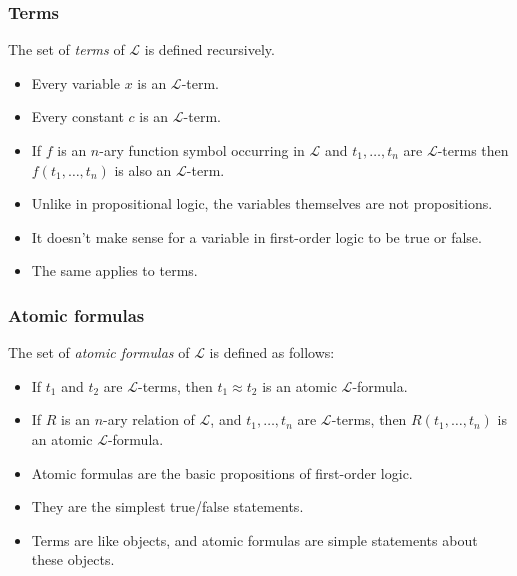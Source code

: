 \documentclass[handout]{beamer}
\newcommand{\sL}{\mathscr{L}}
\begin{document}
\begin{frame}
\frametitle{Terms}

\begin{definition}[Term]
The set of \emph{terms} of $\sL$ is defined recursively.
\begin{itemize}
\item Every variable $x$ is an $\sL$-term.
\item Every constant $c$ is an $\sL$-term.
\item If $f$ is an $n$-ary function symbol occurring in $\sL$ and $t_1,\ldots,t_n$ are $\sL$-terms then $f(t_1,\ldots,t_n)$ is also an $\sL$-term.
\end{itemize}
\end{definition}
\vspace{0.5cm}
\begin{itemize}
\item Unlike in propositional logic, the variables themselves are not propositions. 
\item It doesn't make sense for a variable in first-order logic to be true or false.
\item The same applies to terms.
\end{itemize}
\end{frame}

\begin{frame}
\frametitle{Atomic formulas}
\begin{definition}
The set of \emph{atomic formulas} of $\sL$ is defined as follows:
\begin{itemize}
\item If $t_1$ and $t_2$ are $\sL$-terms, then $t_1\approx t_2$ is an atomic $\sL$-formula.
\item If $R$ is an $n$-ary relation of $\sL$, and $t_1,\ldots,t_n$ are $\sL$-terms, then $R(t_1,\ldots,t_n)$ is an atomic $\sL$-formula. 
\end{itemize} 
\end{definition}
\vspace{0.5cm}
\begin{itemize}
\item Atomic formulas are the basic propositions of first-order logic.
\item They are the simplest true/false statements.
\item Terms are like objects, and atomic formulas are simple statements about these objects.
\end{itemize} 
\end{frame}
\end{document}
